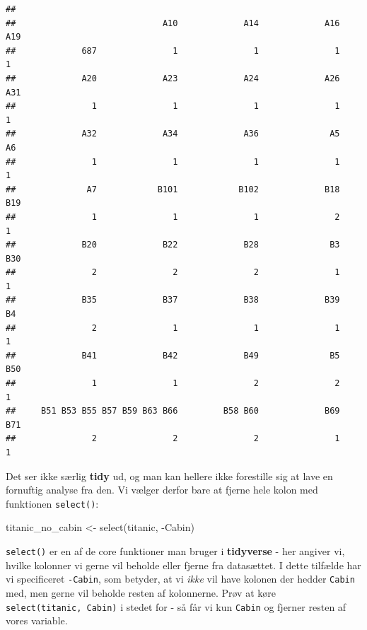 \documentclass[
]{book}
\newenvironment{Shaded}{\begin{snugshade}}{\end{snugshade}}
\newcommand{\DecValTok}[1]{\textcolor[rgb]{0.00,0.00,0.81}{#1}}
\newcommand{\FunctionTok}[1]{\textcolor[rgb]{0.00,0.00,0.00}{#1}}
\newcommand{\NormalTok}[1]{#1}
\newcommand{\OtherTok}[1]{\textcolor[rgb]{0.56,0.35,0.01}{#1}}
\newcommand{\SpecialCharTok}[1]{\textcolor[rgb]{0.00,0.00,0.00}{#1}}
\begin{document}
\begin{Shaded}
\end{Shaded}

\begin{verbatim}
## 
##                             A10             A14             A16             A19 
##             687               1               1               1               1 
##             A20             A23             A24             A26             A31 
##               1               1               1               1               1 
##             A32             A34             A36              A5              A6 
##               1               1               1               1               1 
##              A7            B101            B102             B18             B19 
##               1               1               1               2               1 
##             B20             B22             B28              B3             B30 
##               2               2               2               1               1 
##             B35             B37             B38             B39              B4 
##               2               1               1               1               1 
##             B41             B42             B49              B5             B50 
##               1               1               2               2               1 
##     B51 B53 B55 B57 B59 B63 B66         B58 B60             B69             B71 
##               2               2               2               1               1
\end{verbatim}

Det ser ikke særlig \textbf{tidy} ud, og man kan hellere ikke forestille sig at lave en fornuftig analyse fra den. Vi vælger derfor bare at fjerne hele kolon med funktionen \texttt{select()}:

\begin{Shaded}
\begin{Highlighting}[]
\NormalTok{titanic\_no\_cabin }\OtherTok{\textless{}{-}} \FunctionTok{select}\NormalTok{(titanic, }\SpecialCharTok{{-}}\NormalTok{Cabin) }
\end{Highlighting}
\end{Shaded}

\texttt{select()} er en af de core funktioner man bruger i \textbf{tidyverse} - her angiver vi, hvilke kolonner vi gerne vil beholde eller fjerne fra datasættet. I dette tilfælde har vi specificeret \texttt{-Cabin}, som betyder, at vi \emph{ikke} vil have kolonen der hedder \texttt{Cabin} med, men gerne vil beholde resten af kolonnerne. Prøv at køre \texttt{select(titanic,\ Cabin)} i stedet for - så får vi kun \texttt{Cabin} og fjerner resten af vores variable.
\end{document}
